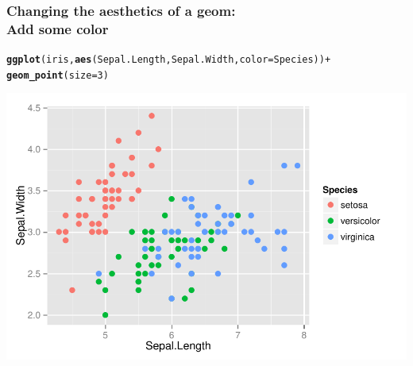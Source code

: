 \documentclass{beamer}\usepackage[]{graphicx}\usepackage[]{color}
\makeatletter
\newcommand{\hlnum}[1]{\textcolor[rgb]{0.686,0.059,0.569}{#1}}%
\newcommand{\hlopt}[1]{\textcolor[rgb]{0,0,0}{#1}}%
\newcommand{\hlstd}[1]{\textcolor[rgb]{0.345,0.345,0.345}{#1}}%
\newcommand{\hlkwc}[1]{\textcolor[rgb]{0.333,0.667,0.333}{#1}}%
\newcommand{\hlkwd}[1]{\textcolor[rgb]{0.737,0.353,0.396}{\textbf{#1}}}%
\newenvironment{kframe}{%
 \def\at@end@of@kframe{}%
 \ifinner\ifhmode%
  \def\at@end@of@kframe{\end{minipage}}%
  \begin{minipage}{\columnwidth}%
 \fi\fi%
 \def\FrameCommand##1{\hskip\@totalleftmargin \hskip-\fboxsep
 \colorbox{shadecolor}{##1}\hskip-\fboxsep
     \hskip-\linewidth \hskip-\@totalleftmargin \hskip\columnwidth}%
 \MakeFramed {\advance\hsize-\width
   \@totalleftmargin\z@ \linewidth\hsize
   \@setminipage}}%
 {\par\unskip\endMakeFramed%
 \at@end@of@kframe}
\newenvironment{knitrout}{}{} %
\makeatother
\begin{document}
\begin{frame}[fragile]
\frametitle{Changing the aesthetics of a geom: \\Add some color}
\begin{knitrout}\footnotesize
{}\color{fgcolor}\begin{kframe}
\begin{alltt}
\hlkwd{ggplot}\hlstd{(iris,} \hlkwd{aes}\hlstd{(Sepal.Length, Sepal.Width,} \hlkwc{color} \hlstd{= Species))} \hlopt{+}
\hlkwd{geom_point}\hlstd{(}\hlkwc{size} \hlstd{=} \hlnum{3}\hlstd{)}
\end{alltt}
\end{kframe}

{\centering \includegraphics[width=.75\linewidth]{figure/first_plot_color_} 

}



\end{knitrout}

\end{frame}

\end{document}
